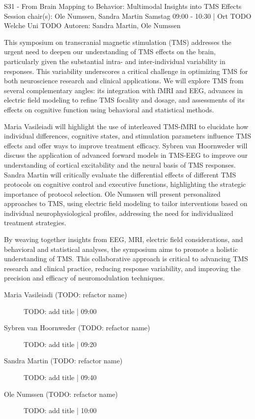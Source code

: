 
            \begin{symposium}
            {S31 - From Brain Mapping to Behavior: Multimodal Insights into TMS Effects}
            {Session chair(s):  Ole Numssen, Sandra Martin}
            {Samstag 09:00 - 10:30 | Ort TODO}
            {Welche Uni TODO}
            Autoren: Sandra Martin, Ole Numssen

This symposium on transcranial magnetic stimulation (TMS) addresses the urgent need to deepen our understanding of TMS effects on the brain, particularly given the substantial intra- and inter-individual variability in responses. This variability underscores a critical challenge in optimizing TMS for both neuroscience research and clinical applications. We will explore TMS from several complementary angles: its integration with fMRI and EEG, advances in electric field modeling to refine TMS focality and dosage, and assessments of its effects on cognitive function using behavioral and statistical methods.

Maria Vasileiadi will highlight the use of interleaved TMS-fMRI to elucidate how individual differences, cognitive states, and stimulation parameters influence TMS effects and offer ways to improve treatment efficacy. Sybren van Hoornweder will discuss the application of advanced forward models in TMS-EEG to improve our understanding of cortical excitability and the neural basis of TMS responses. Sandra Martin will critically evaluate the differential effects of different TMS protocols on cognitive control and executive functions, highlighting the strategic importance of protocol selection. Ole Numssen will present personalized approaches to TMS, using electric field modeling to tailor interventions based on individual neurophysiological profiles, addressing the need for individualized treatment strategies.

By weaving together insights from EEG, MRI, electric field considerations, and behavioral and statistical analyses, the symposium aims to promote a holistic understanding of TMS. This collaborative approach is critical to advancing TMS research and clinical practice, reducing response variability, and improving the precision and efficacy of neuromodulation techniques.
            \begin{description}    
            
                \item [Maria Vasileiadi (TODO: refactor name)] TODO: add title \textcolor{mygray}{ | 09:00}    
                
                \item [Sybren van Hoornweder (TODO: refactor name)] TODO: add title \textcolor{mygray}{ | 09:20}    
                
                \item [Sandra Martin (TODO: refactor name)] TODO: add title \textcolor{mygray}{ | 09:40}    
                
                \item [Ole Numssen (TODO: refactor name)] TODO: add title \textcolor{mygray}{ | 10:00}    
                
            \end{description} 
            \end{symposium}
            